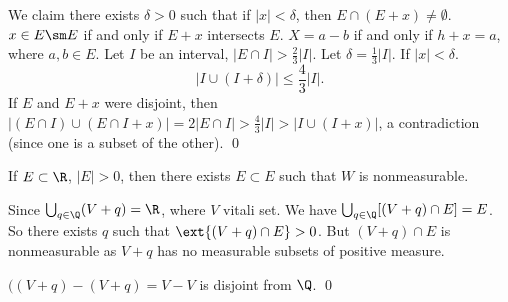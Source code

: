 
\pf We claim there exists $\delta>0$ such that if $|x|<\delta$, then $E \cap (E+x) \neq \emptyset$. $x \in E \sm E$ if and only if $E+x$ intersects $E$. $X= a-b$ if and only if $h+x=a$, where $a,b \in E$. Let $I$ be an interval, $|E \cap I|> \frac{2}{3} |I|$. Let $\delta= \frac{1}{3} |I|$. If $|x|<\delta$.
	\[
	|I \cup (I+\delta)| \leq \frac{4}{3} |I|. 
	\]
If $E$ and $E+x$ were disjoint, then $| (E \cap I) \cup (E \cap I +x)|= 2|E \cap I|> \frac{4}{3} |I|> |I \cup (I+x)|$, a contradiction (since one is a subset of the other). \qed \\



\begin{thm}
If $E \subset \R$, $|E|>0$, then there exists $E \subset E$ such that $W$ is nonmeasurable. 
\end{thm}

\pf Since $\bigcup_{q \in \Q} (V+q)=\R$, where $V$ vitali set. We have $\bigcup_{q \in \Q} [(V+q) \cap E]=E$. So there exists $q$ such that $\ext{(V+q) \cap E} >0$. But $(V+q) \cap E$ is nonmeasurable as $V+q$ has no measurable subsets of positive measure. 

$((V+q)-(V+q)= V-V$ is disjoint from $\Q$. \qed \\
































